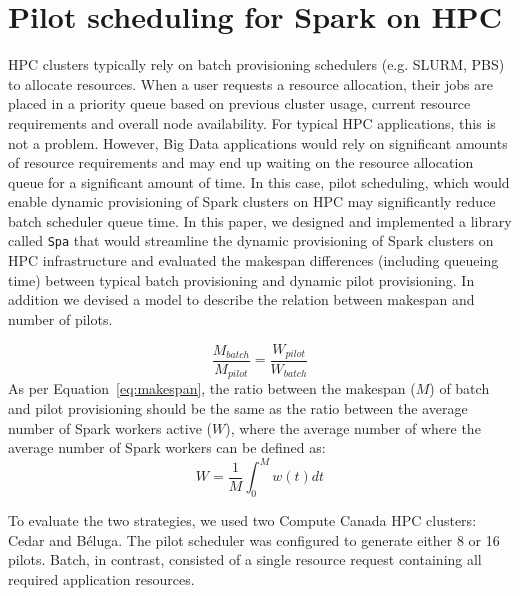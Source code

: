\documentclass{report}
\begin{document}
        \section{Pilot scheduling for Spark on HPC}\label{section:escience2019}

        HPC clusters typically rely on batch provisioning schedulers (e.g. SLURM, PBS)
        to allocate resources. When a user requests a resource allocation, their jobs
        are placed in a priority queue based on previous cluster usage, current resource
        requirements and overall node availability. For typical HPC applications,
        this is not a problem. However, Big Data applications would rely on significant
        amounts of resource requirements and may end up waiting on the resource allocation
        queue for a significant amount of time. In this case, pilot scheduling, which
        would enable dynamic provisioning of Spark clusters on HPC may significantly
        reduce batch scheduler queue time. In this paper, we designed and implemented
        a library called \texttt{Spa} that would streamline the dynamic provisioning of
        Spark clusters on HPC infrastructure and evaluated the makespan differences
        (including queueing time) between typical batch provisioning and 
        dynamic pilot provisioning. In addition we devised a model to
        describe the relation between makespan and number of pilots.

        \begin{equation}\label{eq:makespan}                                                       
            \frac{M_{batch}}{M_{pilot}} = \frac{W_{pilot}}{W_{batch}}
        \end{equation} 
        As per Equation~\ref{eq:makespan}, the ratio between the makespan ($M$) of batch
        and pilot provisioning should be the same as the ratio between the average number
        of Spark workers active ($W$), where the average number of where the average number
        of Spark workers can be defined as:
        \begin{equation}\label{eq:avgw}
            W = \frac{1}{M}\int_0^M{w(t)dt}
        \end{equation}

        To evaluate the two strategies, we used two Compute Canada HPC clusters: 
        Cedar and B\'eluga. The pilot scheduler was configured to generate either 8 or 16 pilots.
        Batch, in contrast, consisted of a single resource request containing all
        required application resources.
\end{document}
